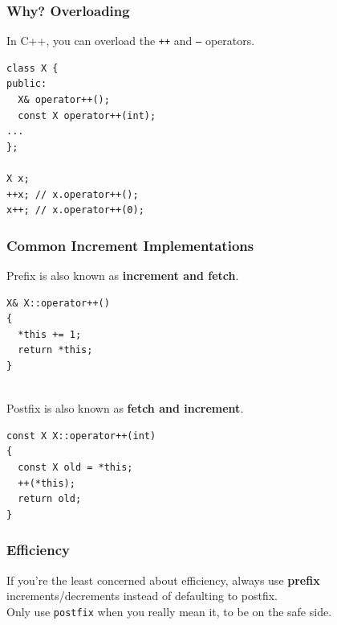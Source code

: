 \documentclass[aspectratio=43]{beamer}
\newenvironment{changemargin}[1]{%
  \begin{list}{}{%
    \setlength{\topsep}{0pt}%
    \setlength{\leftmargin}{#1}%
    \setlength{\rightmargin}{1em}
    \setlength{\listparindent}{\parindent}%
    \setlength{\itemindent}{\parindent}%
    \setlength{\parsep}{\parskip}%
  }%
  \item[]}{\end{list}}
\begin{document}
\begin{frame}[fragile]
  \frametitle{Why? Overloading}

  \begin{changemargin}{1.5cm}

  In C++, you can overload the {\tt ++} and {\tt --} operators.

  \begin{lstlisting}
class X {
public:
  X& operator++();
  const X operator++(int);
...
};

X x;
++x; // x.operator++();
x++; // x.operator++(0);
  \end{lstlisting}
  \end{changemargin}
\end{frame}

\begin{frame}[fragile]
  \frametitle{Common Increment Implementations}

  \begin{changemargin}{1.5cm}

  Prefix is also known as {\bf increment and fetch}.

  \begin{lstlisting}
X& X::operator++()
{
  *this += 1;
  return *this;
}
  \end{lstlisting}
~\\[1em]

  Postfix is also known as {\bf fetch and increment}.

  \begin{lstlisting}
const X X::operator++(int)
{
  const X old = *this;
  ++(*this);
  return old;
}
  \end{lstlisting}
  \end{changemargin}
\end{frame}

\begin{frame}
  \frametitle{Efficiency}

  \begin{changemargin}{1cm}
  If you're the least concerned about efficiency, always use
  {\bf prefix} increments/decrements instead of defaulting to postfix.\\[1em]

  Only use {\tt postfix} when you really mean it, to be on the safe side.
  \end{changemargin}
\end{frame}
\end{document}
